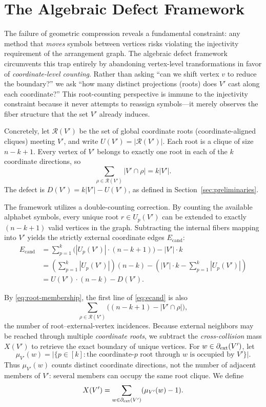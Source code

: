 \section{The Algebraic Defect Framework}\label{sec:defect}

The failure of geometric compression reveals a fundamental constraint: any
method that \emph{moves} symbols between vertices risks violating the
injectivity requirement of the arrangement graph. The algebraic defect framework
circumvents this trap entirely by abandoning vertex-level transformations in
favor of \emph{coordinate-level counting}. Rather than asking ``can we shift
vertex $v$ to reduce the boundary?'' we ask ``how many distinct projections
(roots) does $V'$ cast along each coordinate?'' This root-counting perspective
is immune to the injectivity constraint because it never attempts to reassign
symbols---it merely observes the fiber structure that the set $V'$ already
induces.

Concretely, let $\mathcal R(V')$ be the set of global coordinate roots
(coordinate-aligned cliques) meeting $V'$, and write
$U(V')=|\mathcal R(V')|$.  Each root is a clique of size $n-k+1$.  Every
vertex of $V'$ belongs to exactly one root in each of the $k$ coordinate
directions, so
\begin{equation}\label{eq:root-membership}
 \sum_{\rho\in\mathcal R(V')}|V'\cap\rho|=k|V'|.
\end{equation}
The defect is $D(V')=k|V'|-U(V')$, as defined in
Section~\ref{sec:preliminaries}.

The framework utilizes a double-counting correction. By counting the available
alphabet symbols, every unique root $r \in U_p(V')$ can be extended to exactly
$(n - k + 1)$ valid vertices in the graph. Subtracting the internal fibers
mapping into $V'$ yields the strictly external coordinate edges
$E_{\mathrm{cand}}$:
\begin{align}\label{eq:ecand}
	E_{\mathrm{cand}} & = \sum_{p=1}^k \Big( |U_p(V')| \cdot (n - k + 1) \Big) - |V'| \cdot k \nonumber                           \\
	                  & = \left(\sum_{p=1}^k |U_p(V')|\right)(n-k) - \left(|V'| \cdot k - \sum_{p=1}^k |U_p(V')|\right) \nonumber \\
	                  & = U(V') \cdot (n-k) - D(V').
\end{align}

By \eqref{eq:root-membership}, the first line of \eqref{eq:ecand} is also
\[
 \sum_{\rho\in\mathcal R(V')}
 \bigl((n-k+1)-|V'\cap\rho|\bigr),
\]
the number of root--external-vertex incidences.  Because external neighbors
may be reached through multiple \emph{coordinate
roots}, we subtract the \emph{cross-collision} mass $X(V')$ to retrieve the
exact boundary of unique vertices. For $w\in\partial_{\mathrm{ext}}(V')$, let
\[\mu_{V'}(w)=\bigl|\{p\in[k]:\text{the coordinate-}p
\text{ root through }w\text{ is occupied by }V'\}\bigr|.\]
Thus $\mu_{V'}(w)$ counts distinct coordinate directions, not the number of
adjacent members of $V'$: several members can occupy the same root clique.
We define
\begin{equation}\label{eq:cross-collision}
X(V') = \sum_{w \in \partial_{\mathrm{ext}}(V')} (\mu_{V'}(w) - 1).
\end{equation}

